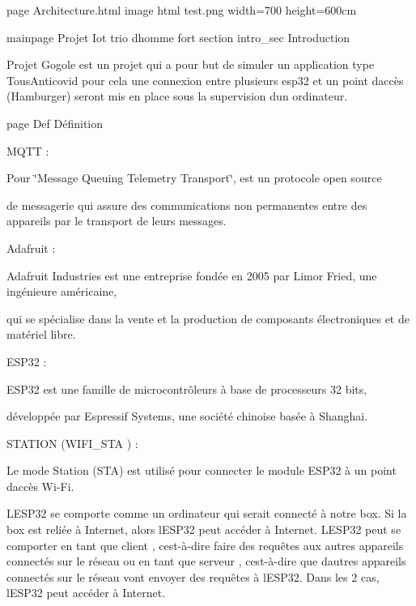 page Architecture.\+html image html test.\+png width=700 height=600cm

mainpage Projet Iot trio d\textquotesingle{}homme fort section intro\+\_\+sec Introduction
\begin{DoxyItemize}
\item Projet Gogole est un projet qui a pour but de simuler un application type Tous\+Anticovid pour cela une connexion entre plusieurs esp32 et un point d\textquotesingle{}accès (Hamburger) seront mis en place sous la supervision d\textquotesingle{}un ordinateur.
\end{DoxyItemize}

page Def Définition

MQTT \+:
\begin{DoxyItemize}
\item Pour \char`\"{}\+Message Queuing Telemetry Transport\char`\"{}, est un protocole open source
\item de messagerie qui assure des communications non permanentes entre des appareils par le transport de leurs messages.
\end{DoxyItemize}

Adafruit \+:
\begin{DoxyItemize}
\item Adafruit Industries est une entreprise fondée en 2005 par Limor Fried, une ingénieure américaine,
\item qui se spécialise dans la vente et la production de composants électroniques et de matériel libre. ~\newline

\end{DoxyItemize}

ESP32 \+:
\begin{DoxyItemize}
\item ESP32 est une famille de microcontrôleurs à base de processeurs 32 bits,
\item développée par Espressif Systems, une société chinoise basée à Shanghai.
\end{DoxyItemize}

STATION (WIFI\+\_\+\+STA ) \+:
\begin{DoxyItemize}
\item Le mode Station (STA) est utilisé pour connecter le module ESP32 à un point d\textquotesingle{}accès Wi-\/\+Fi.
\item L\textquotesingle{}ESP32 se comporte comme un ordinateur qui serait connecté à notre box. Si la box est reliée à Internet, alors l\textquotesingle{}ESP32 peut accéder à Internet. L\textquotesingle{}ESP32 peut se comporter en tant que client , c\textquotesingle{}est-\/à-\/dire faire des requêtes aux autres appareils connectés sur le réseau ou en tant que serveur , c\textquotesingle{}est-\/à-\/dire que d\textquotesingle{}autres appareils connectés sur le réseau vont envoyer des requêtes à l\textquotesingle{}ESP32. Dans les 2 cas, l\textquotesingle{}ESP32 peut accéder à Internet.
\end{DoxyItemize}

